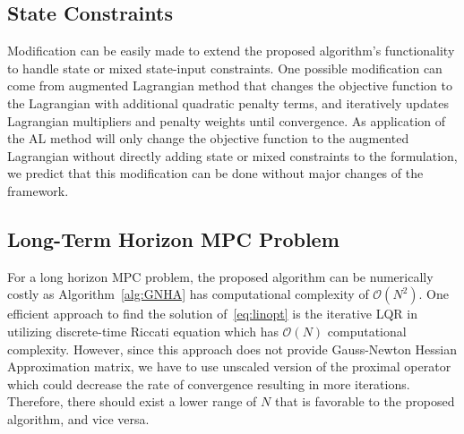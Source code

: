 \subsection{State Constraints}
Modification can be easily made to extend the proposed algorithm's functionality to handle state or mixed state-input constraints. One possible modification can come from augmented Lagrangian method that changes the objective function to the Lagrangian with additional quadratic penalty terms, and iteratively updates Lagrangian multipliers and penalty weights until convergence. %
 As application of the AL method will only change the objective function to the augmented Lagrangian without directly adding state or mixed constraints to the formulation, we predict that this modification can be done without major changes of the framework.      
\subsection{Long-Term Horizon MPC Problem}
For a long horizon MPC problem, the proposed algorithm can be numerically costly as Algorithm~\ref{alg:GNHA} has computational complexity of $\mathcal{O}(N^2)$. %
 One efficient approach to find the solution of~\eqref{eq:linopt} is the iterative LQR in~\cite{1469949} utilizing discrete-time Riccati equation which has $\mathcal{O}(N)$ computational complexity. However, since this approach does not provide Gauss-Newton Hessian Approximation matrix, we have to use unscaled version of the proximal operator which could decrease the rate of convergence resulting in more iterations. %
Therefore, there should exist a lower range of $N$ that is favorable to the proposed algorithm, and vice versa.   
	
